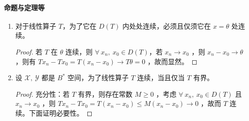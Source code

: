 \paragraph{命题与定理等}
\begin{enumerate}[leftmargin=2cm, label=\arabic*]
    \item 对于线性算子 $T$，为了它在 $D(T)$ 内处处连续，必须且仅须它在 $x = \theta$ 处连续。
\begin{proof}
    若 $T$ 在 $\theta$ 连续，则 $\forall\ x_n,\ x_0\in D(T)$，若 $x_n\to x_0$ ，则 $x_n - x_0 \to \theta$ ，则有 $Tx_n - Tx_0 = T(x_n - x_0) \to T\theta = 0$ ，故而显然。
\end{proof}
    \item 设 $\mathscr{X},\ \mathscr{Y}$ 都是 $B^*$ 空间，为了线性算子 $T$ 连续，当且仅当 $T$ 有界。
\begin{proof}
    充分性：若 $T$ 有界，则存在常数 $M\geqslant 0$ ，考虑 $\forall\ x_n,\ x_0\in D(T)$ 且 $x_n\to x_0$ ，则 $Tx_n - Tx_0 = T(x_n - x_0) \leqslant M (x_n - x_0) \to 0$ ，故而 $T$ 连续。下面证明必要性。


\end{proof}
\end{enumerate}

